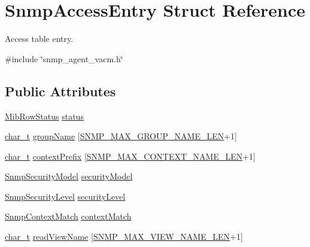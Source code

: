 \hypertarget{structSnmpAccessEntry}{}\section{Snmp\+Access\+Entry Struct Reference}
\label{structSnmpAccessEntry}


Access table entry.  




{\ttfamily \#include \char`\"{}snmp\+\_\+agent\+\_\+vacm.\+h\char`\"{}}

\subsection*{Public Attributes}
\begin{DoxyCompactItemize}
\item 
\hyperlink{mib__common_8h_a40ce1ea958f5c3b04f841d76f5557097}{Mib\+Row\+Status} \hyperlink{structSnmpAccessEntry_a8abdd58d85a24efce6aba1b1948f1616}{status}
\item 
\hyperlink{compiler__port_8h_a40bb5262bf908c328fbcfbe5d29d0201}{char\+\_\+t} \hyperlink{structSnmpAccessEntry_a00aa9f193a226e0d2b3753225fbab667}{group\+Name} \mbox{[}\hyperlink{snmp__common_8h_a0810d82091ca56abdd23f86a04944c32}{S\+N\+M\+P\+\_\+\+M\+A\+X\+\_\+\+G\+R\+O\+U\+P\+\_\+\+N\+A\+M\+E\+\_\+\+L\+EN}+1\mbox{]}
\item 
\hyperlink{compiler__port_8h_a40bb5262bf908c328fbcfbe5d29d0201}{char\+\_\+t} \hyperlink{structSnmpAccessEntry_aed0f5f189ab50350b9e50d28a65faa39}{context\+Prefix} \mbox{[}\hyperlink{snmp__common_8h_a59ce7ec8feba50f15272257094e14ac8}{S\+N\+M\+P\+\_\+\+M\+A\+X\+\_\+\+C\+O\+N\+T\+E\+X\+T\+\_\+\+N\+A\+M\+E\+\_\+\+L\+EN}+1\mbox{]}
\item 
\hyperlink{snmp__agent__usm_8h_a59354ab45890b9da1b27d44f88193695}{Snmp\+Security\+Model} \hyperlink{structSnmpAccessEntry_a226703910f64e584c35dece895584f8f}{security\+Model}
\item 
\hyperlink{snmp__agent__usm_8h_a51b89f597dc71c414d602a9195864612}{Snmp\+Security\+Level} \hyperlink{structSnmpAccessEntry_a46ecf3e9fa2ef86d3661de5ceb279f2a}{security\+Level}
\item 
\hyperlink{snmp__agent__vacm_8h_a8cef40e8881cb290d68171da147f6f20}{Snmp\+Context\+Match} \hyperlink{structSnmpAccessEntry_a01114d52380d6cf6d57407e9af503bf0}{context\+Match}
\item 
\hyperlink{compiler__port_8h_a40bb5262bf908c328fbcfbe5d29d0201}{char\+\_\+t} \hyperlink{structSnmpAccessEntry_aa5691126835f643e16eca03938fd7bb5}{read\+View\+Name} \mbox{[}\hyperlink{snmp__common_8h_a8188d8ada88e9fc2c0a6d2010105b14c}{S\+N\+M\+P\+\_\+\+M\+A\+X\+\_\+\+V\+I\+E\+W\+\_\+\+N\+A\+M\+E\+\_\+\+L\+EN}+1\mbox{]}

\end{DoxyCompactItemize}
